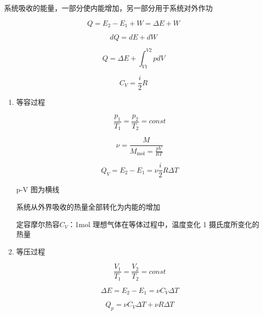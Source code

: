 系统吸收的能量，一部分使内能增加，另一部分用于系统对外作功

\begin{equation}
    Q=E_2-E_1+W=\Delta{}E+W
\end{equation}

\begin{equation}
    dQ=dE+dW
\end{equation}

\begin{equation}
    Q=\Delta{E}+\int_{V1}^{V2}{pdV}
\end{equation}

\begin{equation}
    C_V=\frac{i}{2}R
\end{equation}

\begin{enumerate}

    \item 等容过程

          \begin{equation}
              \frac{p_1}{T_1}=\frac{p_2}{T_2}=\mathit{const}
          \end{equation}

          \begin{equation}
              \nu{}=\frac{M}{M_\mathrm{mol}=\frac{pV}{RT}}
          \end{equation}

          \begin{equation}
              Q_V=E_2-E_1=\nu{}\frac{i}{2}R\Delta{T}
          \end{equation}

          p-V 图为横线

          系统从外界吸收的热量全部转化为内能的增加

          定容摩尔热容$C_V$：1mol 理想气体在等体过程中，温度变化 1 摄氏度所变化的热量

    \item 等压过程

          \begin{equation}
              \frac{V_1}{T_1}=\frac{V_2}{T_2}=\mathit{const}
          \end{equation}


          \begin{equation}
              \Delta{}E=E_2-E_1=\nu{}C_V\Delta{T}
          \end{equation}

          \begin{equation}
              Q_p=\nu{}C_V\Delta{T}+\nu{}R\Delta{T}
          \end{equation}


\end{enumerate}
